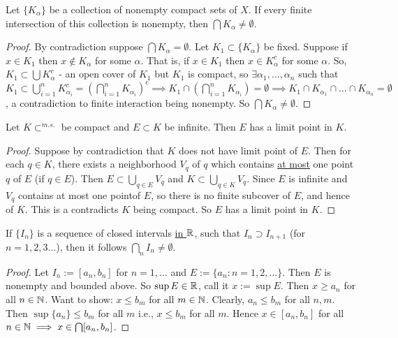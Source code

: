 \documentclass[]{article}
\begin{document}
\begin{theorem}
	Let $\{K_\alpha\}$ be a collection of nonempty compact sets of $X$.
	If every finite intersection of this collection is nonempty, then $\bigcap K_\alpha \neq \emptyset$.
\end{theorem}
\begin{proof}
	By contradiction suppose $\bigcap K_\alpha = \emptyset$.
	Let $K_1\subset \{K_\alpha\}$ be fixed. Suppose if $x\in K_1$ then $x\notin K_\alpha$ for some $\alpha$.
	That is, if $x\in K_1$ then $x\in K_\alpha^c$ for some $\alpha$.
	So, $K_1\subset \bigcup K_\alpha^c$ - an open cover of $K_1$ but $K_1$ is compact, so $\exists \alpha_1,\dots,\alpha_n$ such that $K_1\subset \bigcup_{i=1}^n K_{\alpha_i}^c = (\bigcap_{i=1}^n K_{\alpha_i})^c \implies K_1 \cap (\bigcap_{i=1}^n K_{\alpha_i}) = \emptyset \implies K_1\cap K_{\alpha_1}\cap \dots\cap K_{\alpha_n} = \emptyset$, a contradiction to finite interaction being nonempty.
	So $\bigcap K_\alpha \neq \emptyset$.
\end{proof}

\begin{theorem}
	Let $K\subset^{m.s.}$ be compact and $E\subset K$ be infinite.
	Then $E$ has a limit point in $K$.
\end{theorem}
\begin{proof}
	Suppose by contradiction that $K$ does not have limit point of $E$.
	Then for each $q\in K$, there exists a neighborhood $V_q$ of $q$ which contains \ul{at most} one point $q$ of $E$ (if $q\in E$).
	Then $E\subset \bigcup_{q\in E} V_q$ and $K\subset \bigcup_{q\in K} V_q$.
	Since $E$ is infinite and $V_q$ contains at most one pointof $E$, so there is no finite subcover of $E$, and hence of $K$. This is a contradicts $K$ being compact.
	So $E$ has a limit point in $K$.
\end{proof}

\begin{theorem}
	If $\{I_n\}$ is a sequence of closed intervals \ul{in $\mathbb{R}$}, such that $I_n\supset I_{n+1}$ (for $n = 1,2,3\dots$), then it follows $\bigcap_n I_n\neq \emptyset$.
\end{theorem}
\begin{proof}
	Let $I_n := [a_n,b_n]$ for $n=1,\dots$ and $E:= \{a_n: n = 1,2,\dots\}$.
	Then $E$ is nonempty and bounded above. So $\sup E\in \mathbb{R}$, call it $x:= \sup E$.
	Then $x\geq a_n$ for all $n\in \mathbb{N}$.
	Want to show: $x\leq b_m$ for all $m\in \mathbb{N}$. Clearly, $a_n\leq b_m$ for all $n,m$.
	Then $\sup \{a_n\} \leq b_m$ for all $m$ i.e., $x\leq b_m$ for all $m$.
	Hence $x\in[a_n,b_n]$ for all $n\in\mathbb{N} \implies x\in \bigcap [a_n,b_n]$.
\end{proof}
\end{document}
